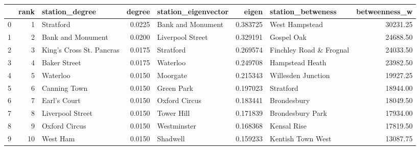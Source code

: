 \begin{tabular}{lrlrlrlr}
\toprule
{} &  rank &            station\_degree &  degree & station\_eigenvector &     eigen &        station\_betweness &  betweenness\_w \\
\midrule
0 &     1 &                 Stratford &  0.0225 &   Bank and Monument &  0.383725 &           West Hampstead &       30231.25 \\
1 &     2 &         Bank and Monument &  0.0200 &    Liverpool Street &  0.329191 &               Gospel Oak &       24688.50 \\
2 &     3 &  King's Cross St. Pancras &  0.0175 &           Stratford &  0.269574 &  Finchley Road \& Frognal &       24033.50 \\
3 &     4 &              Baker Street &  0.0175 &            Waterloo &  0.249708 &          Hampstead Heath &       23982.50 \\
4 &     5 &                  Waterloo &  0.0150 &            Moorgate &  0.215343 &       Willesden Junction &       19927.25 \\
5 &     6 &              Canning Town &  0.0150 &          Green Park &  0.197023 &                Stratford &       18944.00 \\
6 &     7 &              Earl's Court &  0.0150 &       Oxford Circus &  0.183441 &              Brondesbury &       18049.50 \\
7 &     8 &          Liverpool Street &  0.0150 &          Tower Hill &  0.171839 &         Brondesbury Park &       17934.00 \\
8 &     9 &             Oxford Circus &  0.0150 &         Westminster &  0.168368 &              Kensal Rise &       17819.50 \\
9 &    10 &                  West Ham &  0.0150 &            Shadwell &  0.159233 &        Kentish Town West &       13087.75 \\
\bottomrule
\end{tabular}

